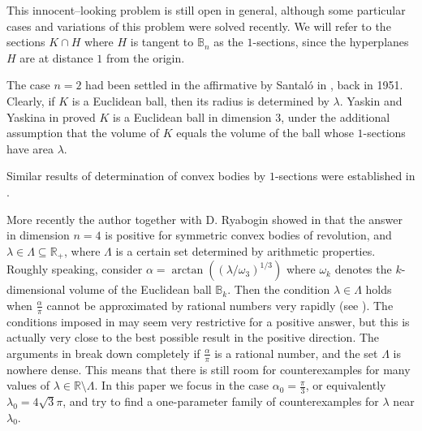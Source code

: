 \documentclass{amsart}
\def \R{\mathbb R}
\def \B{\mathbb B}
\begin{document}
This innocent--looking problem is still open in general, although some particular cases and variations of this problem were solved recently.
We will refer to the sections $K \cap H$ where $H$ is tangent to $\B_n$ as the $1$-sections, since the hyperplanes $H$ are at distance $1$ from the origin.

The case $n=2$ had been settled in the affirmative by Santaló in \cite{santalo1951two}, back in 1951.
Clearly, if $K$ is a Euclidean ball, then its radius is determined by $\lambda$.
Yaskin and Yaskina in \cite{yaskin2015thick} proved $K$ is a Euclidean ball in dimension $3$, under the additional assumption that the volume of $K$ equals the volume of the ball whose $1$-sections have area $\lambda$.

Similar results of determination of convex bodies by $1$-sections were established in \cite{yaskin2011unique, alfonseca2025characterizations, alfonseca2025croft, gardner2012problem, kurusa2015characterizations, nazarov2014asymmetric, yaskin2017non}.

More recently the author together with D. Ryabogin showed in \cite{haddad2026convex} that the answer in dimension $n=4$ is positive for symmetric convex bodies of revolution, and $\lambda \in \Lambda \subseteq \R_+$, where $\Lambda$ is a certain set determined by arithmetic properties.
Roughly speaking, consider $\alpha = \arctan((\lambda/\omega_3)^{1/3})$ where $\omega_k$ denotes the $k$-dimensional volume of the Euclidean ball $\B_k$.
Then the condition $\lambda \in \Lambda$ holds when $\frac{\alpha}{\pi}$ cannot be approximated by rational numbers very rapidly (see \cite[Definition 8]{haddad2026convex}).
The conditions imposed in \cite{haddad2026convex} may seem very restrictive for a positive answer, but this is actually very close to the best possible result in the positive direction.
The arguments in \cite{haddad2026convex} break down completely if $\frac{\alpha}{\pi}$ is a rational number, and the set $\Lambda$ is nowhere dense. This means that there is still room for counterexamples for many values of $\lambda \in \R \setminus \Lambda$. In this paper we focus in the case $\alpha_0=\frac \pi 3$, or equivalently $\lambda_0 = 4 \sqrt{3} \pi$, and try to find a one-parameter family of counterexamples for $\lambda$ near $\lambda_0$.
\end{document}

